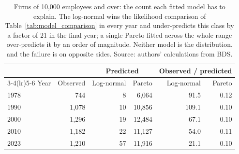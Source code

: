 \begin{table}[H]
\caption{Firms of 10{,}000 employees and over: the count each fitted model has to
explain. The log-normal wins the likelihood comparison of Table~\ref{tab:model_comparison}
in every year and under-predicts this class by a factor of 21 in the final year; a single
Pareto fitted across the whole range over-predicts it by an order of magnitude. Neither
model is the distribution, and the failure is on opposite sides. Source: authors'
calculations from BDS.}
\label{tab:topbin}
\begin{tabular}{lrrrrr}
\toprule
 & & \multicolumn{2}{c}{Predicted} & \multicolumn{2}{c}{Observed / predicted} \\
\cmidrule(lr){3-4}\cmidrule(lr){5-6}
Year & Observed & Log-normal & Pareto & Log-normal & Pareto \\
\midrule
1978 & 744 & 8 & 6,064 & 91.5 & 0.12 \\
1990 & 1,078 & 10 & 10,856 & 109.1 & 0.10 \\
2000 & 1,296 & 19 & 12,484 & 67.1 & 0.10 \\
2010 & 1,182 & 22 & 11,127 & 54.0 & 0.11 \\
2023 & 1,210 & 57 & 11,916 & 21.1 & 0.10 \\
\bottomrule
\end{tabular}
\end{table}
